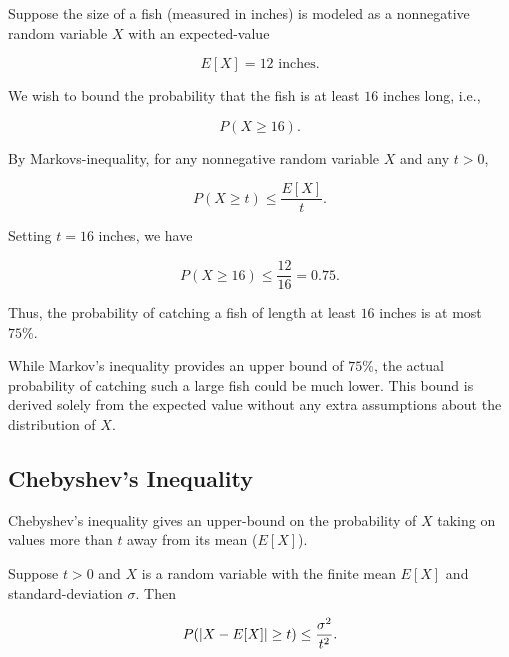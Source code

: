\documentclass{article}
\begin{document}
\begin{example}\label{markov-inequality-fish}
Suppose the size of a fish (measured in inches) is modeled as a nonnegative \@{random variable} $X$ with an \@{expected-value}

\[ E[X] = 12 \text{ inches}. \]

We wish to bound the \@{probability} that the fish is at least $16$ inches long, i.e.,

\[ P(X \ge 16). \]

By \@{Markovs-inequality}, for any nonnegative random variable $X$ and any $t > 0$,

\[ P(X \ge t) \le \frac{E[X]}{t}. \]

Setting $t = 16$ inches, we have

\[ P(X \ge 16) \le \frac{12}{16} = 0.75. \]

Thus, the probability of catching a fish of length at least $16$ inches is at most $75\%$.

\begin{remark}[Interpretation]
While \@{Markov's inequality} provides an upper bound of $75\%$, the actual \@{probability} of catching such a large fish could be much lower. This bound is derived solely from the \@{expected value} without any extra assumptions about the distribution of $X$.
\end{remark}
\end{example}

\subsection{Chebyshev's Inequality}

\@{Chebyshev's inequality} gives an upper-bound on the \@{probability} of $X$ taking on values more than $t$ away from its mean ($E[X]$).

\begin{theorem}\label{chebyshevs-inequality}
Suppose $t > 0$ and $X$ is a \@{random variable} with the finite mean $E[X]$ and \@{standard-deviation} $\sigma.$ Then

\[ P(\left| X - E[X] \right| \geq t) \leq \frac{\sigma^2}{t^2}. \]
\end{theorem}
\end{document}
